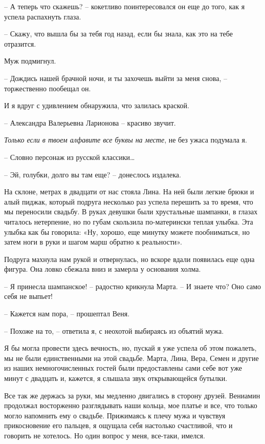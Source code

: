 \documentclass[
]{book}
\begin{document}
-- А теперь что скажешь? -- кокетливо поинтересовался он еще до того, как я успела распахнуть глаза.

-- Скажу, что вышла бы за тебя год назад, если бы знала, как это на тебе отразится.

Муж подмигнул.

-- Дождись нашей брачной ночи, и ты захочешь выйти за меня снова, -- торжественно пообещал он.

И я вдруг с удивлением обнаружила, что залилась краской.

-- Александра Валерьевна Ларионова -- красиво звучит.

\emph{Только если в твоем алфавите все буквы на месте}, не без ужаса подумала я.

-- Словно персонаж из русской классики\ldots{}

-- Эй, голубки, долго вы там еще? -- донеслось издалека.

На склоне, метрах в двадцати от нас стояла Лина. На ней были легкие брюки и алый пиджак, который подруга несколько раз успела перешить за то время, что мы переносили свадьбу. В руках девушки были хрустальные шампанки, в глазах читалось нетерпение, но по губам скользила по-матерински теплая улыбка. Эта улыбка как бы говорила: «Ну, хорошо, еще минутку можете пообниматься, но затем ноги в руки и шагом марш обратно к реальности».

Подруга махнула нам рукой и отвернулась, но вскоре вдали появилась еще одна фигура. Она ловко сбежала вниз и замерла у основания холма.

-- Я принесла шампанское! -- радостно крикнула Марта. -- И знаете что? Оно само себя не выпьет!

-- Кажется нам пора, -- прошептал Веня.

-- Похоже на то, -- ответила я, с неохотой выбираясь из объятий мужа.

Я бы могла провести здесь вечность, но, пускай я уже успела об этом пожалеть, мы не были единственными на этой свадьбе. Марта, Лина, Вера, Семен и другие из наших немногочисленных гостей были предоставлены сами себе вот уже минут с двадцать и, кажется, я слышала звук открывающейся бутылки.

Все так же держась за руки, мы медленно двигались в сторону друзей. Вениамин продолжал восторженно разглядывать наши кольца, мое платье и все, что только могло напомнить ему о свадьбе. Прижимаясь к плечу мужа и чувствуя прикосновение его пальцев, я ощущала себя настолько счастливой, что и говорить не хотелось. Но один вопрос у меня, все-таки, имелся.
\end{document}
